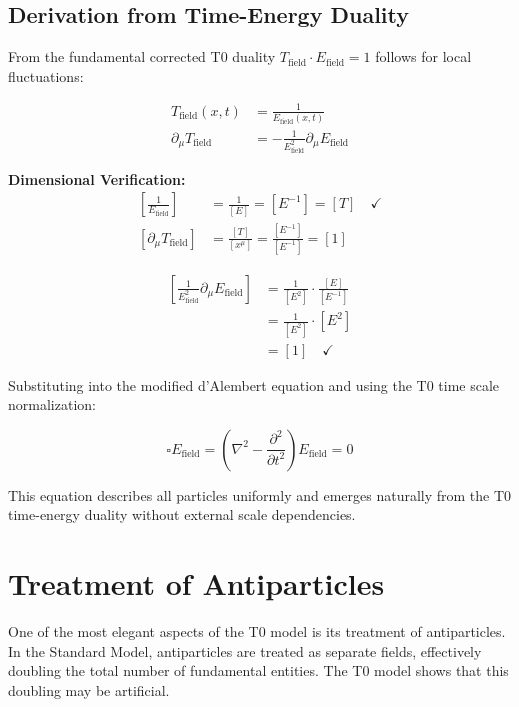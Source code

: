 \documentclass[12pt,a4paper]{report}
\begin{document}
\subsection{Derivation from Time-Energy Duality}
\label{subsec:derivation_wave_equation}

From the fundamental corrected T0 duality $T_{\text{field}} \cdot E_{\text{field}} = 1$ follows for local fluctuations:

\begin{align}
	T_{\text{field}}(x,t) &= \frac{1}{E_{\text{field}}(x,t)} \\
	\partial_\mu T_{\text{field}} &= -\frac{1}{E_{\text{field}}^2} \partial_\mu E_{\text{field}}
\end{align}

\textbf{Dimensional Verification:}
\begin{align}
	\left[\frac{1}{E_{\text{field}}}\right] &= \frac{1}{[E]} = [E^{-1}] = [T] \quad \checkmark \\
	\left[\partial_\mu T_{\text{field}}\right] &= \frac{[T]}{[x^\mu]} = \frac{[E^{-1}]}{[E^{-1}]} = [1]
\end{align}

\begin{align}
	\left[\frac{1}{E_{\text{field}}^2} \partial_\mu E_{\text{field}}\right] &= \frac{1}{[E^2]} \cdot \frac{[E]}{[E^{-1}]} \\
	&= \frac{1}{[E^2]} \cdot [E^2] \\
	&= [1] \quad \checkmark
\end{align}

Substituting into the modified d'Alembert equation and using the T0 time scale normalization:

\begin{equation}
	\square E_{\text{field}} = \left(\nabla^2 - \frac{\partial^2}{\partial t^2}\right) E_{\text{field}} = 0
	\label{eq:universal_wave_equation}
\end{equation}

This equation describes all particles uniformly and emerges naturally from the T0 time-energy duality without external scale dependencies.
	\section{Treatment of Antiparticles}
	
	One of the most elegant aspects of the T0 model is its treatment of antiparticles. In the Standard Model, antiparticles are treated as separate fields, effectively doubling the total number of fundamental entities. The T0 model shows that this doubling may be artificial.
	
\end{document}
